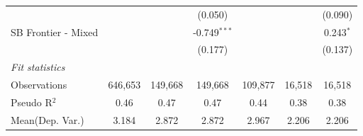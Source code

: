 \begin{tabular}{lcccccc}
                        &               &               & (0.050)        &               &               & (0.090)\\   
   SB Frontier - Mixed  &               &               & -0.749$^{***}$ &               &               & 0.243$^{*}$\\   
                        &               &               & (0.177)        &               &               & (0.137)\\   
   \midrule
   \emph{Fit statistics}\\
   Observations         & 646,653       & 149,668       & 149,668        & 109,877       & 16,518        & 16,518\\  
   Pseudo R$^2$         & 0.46          & 0.47          & 0.47           & 0.44          & 0.38          & 0.38\\  
Mean(Dep. Var.) & 3.184 & 2.872 & 2.872 & 2.967 & 2.206 & 2.206 \\
   

\end{tabular}
